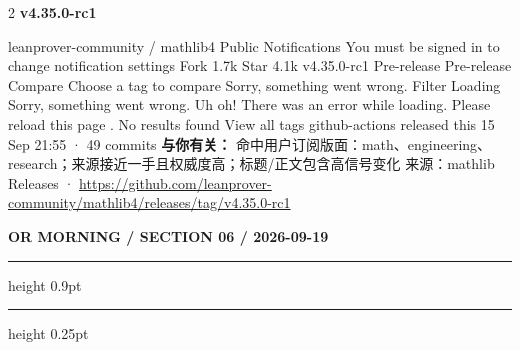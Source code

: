 \documentclass[10.5pt]{ctexart}
\begin{document}
\begin{multicols}{2}
{\large\bfseries v4.35.0-rc1}\par
leanprover-community / mathlib4 Public Notifications You must be signed in to change notification settings Fork 1.7k Star 4.1k v4.35.0-rc1 Pre-release Pre-release Compare Choose a tag to compare Sorry, something went wrong. Filter Loading Sorry, something went wrong. Uh oh! There was an error while loading. Please reload this page . No results found View all tags github-actions released this 15 Sep 21:55 · 49 commits
\textbf{与你有关：} 命中用户订阅版面：math、engineering、research；来源接近一手且权威度高；标题/正文包含高信号变化
{\footnotesize\color{ormuted} 来源：mathlib Releases · \url{https://github.com/leanprover-community/mathlib4/releases/tag/v4.35.0-rc1}}
\end{multicols}
\newpage
{\small\bfseries OR MORNING / SECTION 06 / 2026-09-19}
\vspace{2mm}
\hrule height 0.9pt
\vspace{1.5mm}
\hrule height 0.25pt
\vspace{4mm}
\end{document}
